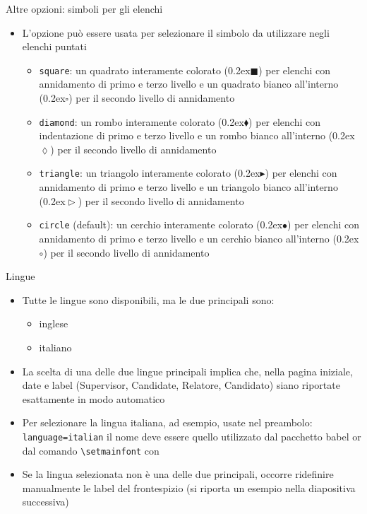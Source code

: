 \begin{frame}[t,fragile]{Altre opzioni: simboli per gli elenchi}
\begin{itemize}
\item L'opzione  può essere usata per selezionare il simbolo da utilizzare negli elenchi puntati
  \begin{itemize}
  \item \verb!square!: un quadrato interamente colorato
        ({\tiny\raise0.2ex\hbox{$\blacksquare$}}) per elenchi con annidamento di primo e terzo livello e un quadrato bianco all'interno
        ({\tiny\raise0.2ex\hbox{$\square$}}) per il secondo livello di annidamento
  \item \verb!diamond!: un rombo interamente colorato
        ({\tiny\raise0.2ex\hbox{$\blacklozenge$}}) per elenchi con indentazione di primo e terzo livello e un rombo bianco all'interno
        ({\tiny\raise0.2ex\hbox{$\lozenge$}}) per il secondo livello di annidamento
  \item \verb!triangle!: un triangolo interamente colorato
        ({\tiny\raise0.2ex\hbox{$\blacktriangleright$}}) per elenchi con annidamento di primo e terzo livello e un triangolo bianco all'interno
        ({\tiny\raise0.2ex\hbox{$\vartriangleright$}}) per il secondo livello di annidamento
  \item \verb!circle! (default): un cerchio interamente colorato
        ({\tiny\raise0.2ex\hbox{$\bullet$}}) per elenchi con annidamento di primo e terzo livello e un cerchio bianco all'interno
        ({\tiny\raise0.2ex\hbox{$\circ$}}) per il secondo livello di annidamento
  \end{itemize}
\end{itemize}
\end{frame}
\begin{frame}[t,fragile]{Lingue}
\begin{itemize}
\item Tutte le lingue sono disponibili, ma le due principali sono:
\begin{itemize}
\item inglese
\item italiano
\end{itemize}
\item La scelta di una delle due lingue principali implica che, nella pagina iniziale, date e label (Supervisor, Candidate, Relatore, Candidato) siano riportate esattamente in modo automatico
\item Per selezionare la lingua italiana, ad esempio, usate nel preambolo:
\verb!language=italian!
il nome deve essere quello utilizzato dal pacchetto babel or dal comando \verb!\setmainfont! con \XeLaTeX
\item Se la lingua selezionata non è una delle due principali, occorre ridefinire manualmente le label del frontespizio (si riporta un esempio nella diapositiva successiva)
\end{itemize}
\end{frame}
